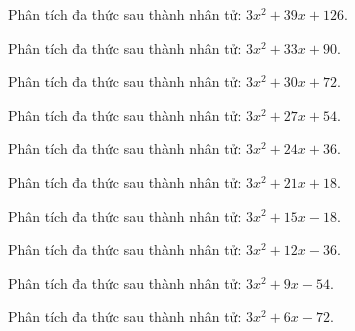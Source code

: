 \begin{bt}
	Phân tích đa thức sau thành nhân tử: $3 x^2 + 39 x + 126$.
\end{bt}
\begin{bt}
	Phân tích đa thức sau thành nhân tử: $3 x^2 + 33 x + 90$.
\end{bt}
\begin{bt}
	Phân tích đa thức sau thành nhân tử: $3 x^2 + 30 x + 72$.
\end{bt}
\begin{bt}
	Phân tích đa thức sau thành nhân tử: $3 x^2 + 27 x + 54$.
\end{bt}
\begin{bt}
	Phân tích đa thức sau thành nhân tử: $3 x^2 + 24 x + 36$.
\end{bt}
\begin{bt}
	Phân tích đa thức sau thành nhân tử: $3 x^2 + 21 x + 18$.
\end{bt}
\begin{bt}
	Phân tích đa thức sau thành nhân tử: $3 x^2 + 15 x - 18$.
\end{bt}
\begin{bt}
	Phân tích đa thức sau thành nhân tử: $3 x^2 + 12 x - 36$.
\end{bt}
\begin{bt}
	Phân tích đa thức sau thành nhân tử: $3 x^2 + 9 x - 54$.
\end{bt}
\begin{bt}
	Phân tích đa thức sau thành nhân tử: $3 x^2 + 6 x - 72$.
\end{bt}
